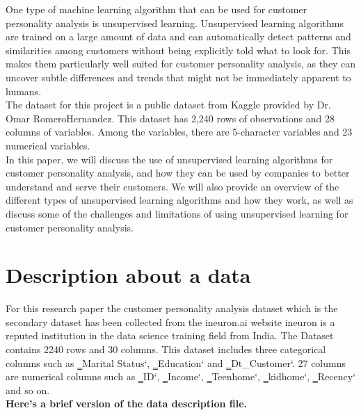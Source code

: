 \documentclass[12pt,a4paper]{report}
\begin{document}
One type of machine learning algorithm that can be used for customer personality analysis is
unsupervised learning. Unsupervised learning algorithms are trained on a large amount of data and
can automatically detect patterns and similarities among customers without being explicitly told
what to look for. This makes them particularly well suited for customer personality analysis, as
they can uncover subtle differences and trends that might not be immediately apparent to humans.\\
The dataset for this project is a public dataset from Kaggle provided by Dr. Omar RomeroHernandez. This dataset has 2,240 rows of observations and 28 columns of variables. Among the
variables, there are 5-character variables and 23 numerical variables.\\

In this paper, we will discuss the use of unsupervised learning algorithms for customer personality
analysis, and how they can be used by companies to better understand and serve their customers.
We will also provide an overview of the different types of unsupervised learning algorithms and
how they work, as well as discuss some of the challenges and limitations of using unsupervised
learning for customer personality analysis.\\



\newpage
\section{Description about a data}

   \vspace{0.2cm}
   For this research paper the customer personality analysis dataset which is the
secondary dataset has been collected from the ineuron.ai website ineuron is a reputed
institution in the data science training field from India. The Dataset contains 2240 rows and
30 columns. This dataset includes three categorical columns such as ‗Marital Status‘,
‗Education‘ and ‗Dt\_Customer‘. 27 columns are numerical columns such as ‗ID‘, ‗Income‘,
‗Teenhome‘, ‗kidhome‘, ‗Recency‘ and so on.\\

\textbf{Here's a brief version of the data description file.}
\vspace{0.2cm}
\end{document}
